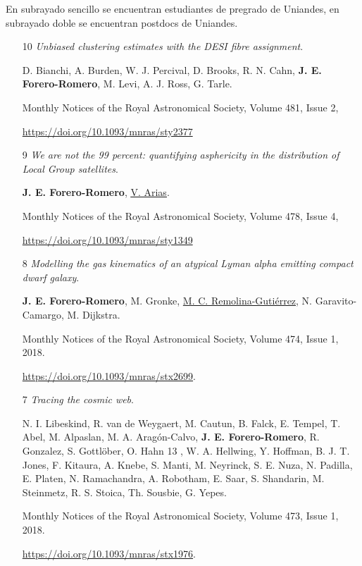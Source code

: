 \documentclass{article}
\begin{document}
En subrayado sencillo se encuentran estudiantes de pregrado de
Uniandes, en subrayado doble se encuentran postdocs de Uniandes.

\begin{itemize}

\item[10]{\it Unbiased clustering estimates with the DESI fibre
  assignment}. 

D. Bianchi, A. Burden,  W. J. Percival, D. Brooks,
R. N. Cahn, {\bf J. E. Forero-Romero}, M. Levi, A. J. Ross, G. Tarle.

Monthly Notices of the Royal Astronomical Society, Volume 481, Issue
2,

\url{https://doi.org/10.1093/mnras/sty2377}

\item[9]{\it We are not the 99 percent: quantifying asphericity in the
  distribution of Local Group satellites}.

{\bf J. E. Forero-Romero}, \underline{\underline{V. Arias}}.

Monthly Notices of the Royal Astronomical Society, Volume 478, Issue
4, 

\url{https://doi.org/10.1093/mnras/sty1349}

\item[8]{\it Modelling the gas kinematics of an atypical Lyman alpha
emitting compact dwarf galaxy}.

{\bf J. E. Forero-Romero}, M. Gronke,
  \underline{M. C. Remolina-Guti\'errez}, N. Garavito-Camargo, M. Dijkstra.

  Monthly Notices of the Royal Astronomical Society, Volume 474, Issue
  1, 2018. 

\url{https://doi.org/10.1093/mnras/stx2699}.  

\item[7]{\it Tracing the cosmic web}.

N. I. Libeskind, R. van de
  Weygaert, M. Cautun, B. Falck, E. Tempel, T. Abel, M. Alpaslan, M. A. Aragón-Calvo, {\bf
  J. E. Forero-Romero},  R. Gonzalez, S. Gottl\"ober, O. Hahn 13 ,
W. A. Hellwing, Y. Hoffman, B. J. T. Jones, F. Kitaura, A. Knebe,
S. Manti, M. Neyrinck, S. E. Nuza, N. Padilla, E. Platen,
N. Ramachandra, A. Robotham, E. Saar, S. Shandarin, M. Steinmetz,
R. S. Stoica, Th. Sousbie, G. Yepes.

Monthly Notices of the Royal Astronomical Society, Volume 473, Issue
1, 2018. 

\url{https://doi.org/10.1093/mnras/stx1976}. 


\end{itemize}
\end{document}
